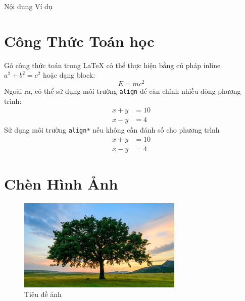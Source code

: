 \documentclass[5p,times,authoryear]{Config/elsarticle}
\begin{document}
\begin{vd}
    Nội dung Ví dụ
\end{vd}

\section{Công Thức Toán học}

Gõ công thức toán trong LaTeX có thể thực hiện bằng cú pháp inline $a^2 + b^2 = c^2$ hoặc dạng block:
\begin{equation}
    E = mc^2
\end{equation}
Ngoài ra, có thể sử dụng môi trường \texttt{align} để căn chỉnh nhiều dòng phương trình:
\begin{align}
    x + y &= 10 \\
    x - y &= 4
\end{align}
Sử dụng môi trường \texttt{align*} nếu không cần đánh số cho phương trình
\begin{align*}
    x + y &= 10 \\
    x - y &= 4
\end{align*}

\section{Chèn Hình Ảnh}

\begin{figure}[h!]
\includegraphics[width=0.7\textwidth]{Images/tree.jpg}
    \centering
    \caption{Tiêu đề ảnh}
    \label{Hình 1}
\end{figure}

\newpage


\nocite{*}
\end{document}
